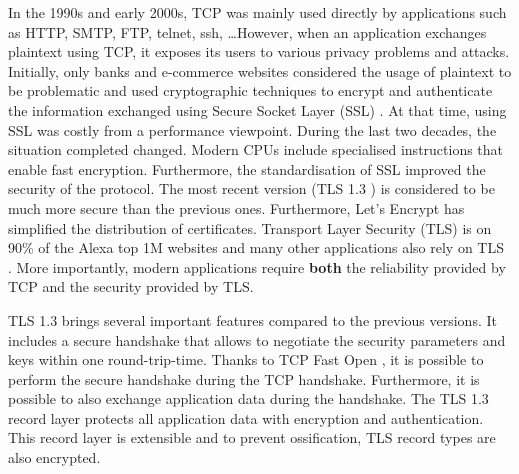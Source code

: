 In the 1990s and early 2000s, TCP was mainly used directly by
applications such as HTTP, SMTP, FTP, telnet, ssh, \ldots However,
when an application exchanges plaintext using TCP, it exposes its
users to various privacy problems and attacks. Initially, only banks
and e-commerce websites considered the usage of plaintext to be
problematic and used cryptographic techniques to encrypt and
authenticate the information exchanged using Secure Socket Layer (SSL)
\cite{draft-hickman-netscape-ssl}. At that time, using SSL was costly
from a performance viewpoint. During the last two decades, the
situation completed changed. Modern CPUs include specialised
instructions that enable fast encryption. Furthermore, the
standardisation of SSL improved the security of the protocol. The most
recent version (TLS 1.3 \cite{rfc8446}) is considered to be much more
secure than the previous ones. Furthermore, Let's Encrypt
\cite{aas2019let} has simplified the distribution of
certificates. 
Transport Layer Security (TLS) is on 90\% of the Alexa
top 1M websites \cite{holz2019era,holz2020tracking} and many other applications also
rely on TLS  \cite{anderson2019tls}. 
More importantly, modern applications
require \textbf{both} the reliability provided by TCP and the security provided
by TLS. 

TLS 1.3 brings several important features compared to the previous
versions. It includes a secure handshake that allows to negotiate the
security parameters and keys within one round-trip-time. Thanks to
TCP Fast Open \cite{radhakrishnan2011tcp}, it is possible to perform
the secure handshake during the TCP handshake. Furthermore, it is
possible to also exchange application data during the handshake.
The TLS 1.3 record layer protects all application data with encryption and
authentication. This record layer is extensible and to prevent
ossification, TLS record types are also encrypted.





